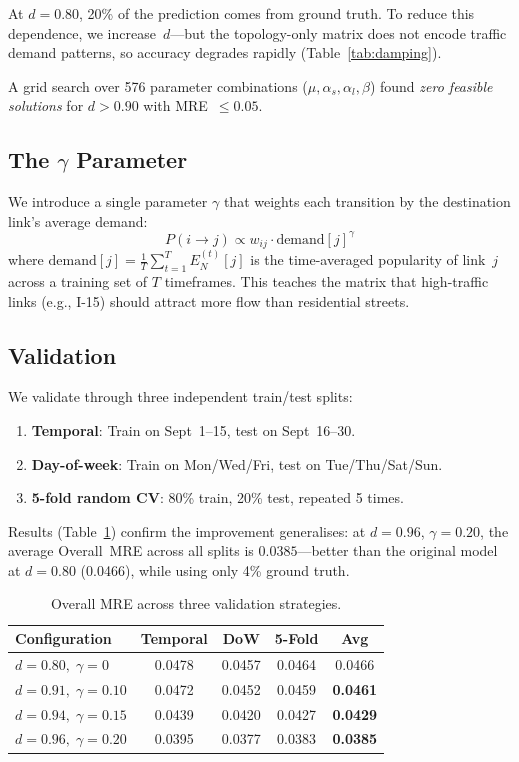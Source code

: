 \documentclass[11pt]{article}
\begin{document}
At $d = 0.80$, 20\% of the prediction comes from ground truth.
To reduce this dependence, we increase~$d$---but the topology-only matrix does not encode traffic demand patterns, so accuracy degrades rapidly (Table~\ref{tab:damping}).

A grid search over 576 parameter combinations ($\mu, \alpha_s, \alpha_l, \beta$) found \emph{zero feasible solutions} for $d > 0.90$ with MRE~$\leq 0.05$.

\subsection{The $\gamma$ Parameter}

We introduce a single parameter $\gamma$ that weights each transition by the destination link's average demand:
\begin{equation}
    \boxed{P(i \to j) \propto w_{ij} \cdot \text{demand}[j]^\gamma}
    \label{eq:gamma}
\end{equation}
where $\text{demand}[j] = \frac{1}{T}\sum_{t=1}^T E_N^{(t)}[j]$ is the time-averaged popularity of link~$j$ across a training set of $T$ timeframes.
This teaches the matrix that high-traffic links (e.g., I-15) should attract more flow than residential streets.

\subsection{Validation}

We validate through three independent train/test splits:
\begin{enumerate}
    \item \textbf{Temporal}: Train on Sept~1--15, test on Sept~16--30.
    \item \textbf{Day-of-week}: Train on Mon/Wed/Fri, test on Tue/Thu/Sat/Sun.
    \item \textbf{5-fold random CV}: 80\% train, 20\% test, repeated 5 times.
\end{enumerate}

Results (Table~\ref{tab:demand_validation}) confirm the improvement generalises: at $d = 0.96$, $\gamma = 0.20$, the average Overall~MRE across all splits is $\mathbf{0.0385}$---better than the original model at $d = 0.80$ (0.0466), while using only 4\% ground truth.

\begin{table}[t]
\centering
\caption{Overall MRE across three validation strategies.}
\label{tab:demand_validation}
\small
\begin{tabular}{lcccc}
\toprule
Configuration & Temporal & DoW & 5-Fold & \textbf{Avg} \\
\midrule
$d{=}0.80,\;\gamma{=}0$ & 0.0478 & 0.0457 & 0.0464 & 0.0466 \\
$d{=}0.91,\;\gamma{=}0.10$ & 0.0472 & 0.0452 & 0.0459 & \textbf{0.0461} \\
$d{=}0.94,\;\gamma{=}0.15$ & 0.0439 & 0.0420 & 0.0427 & \textbf{0.0429} \\
$d{=}0.96,\;\gamma{=}0.20$ & 0.0395 & 0.0377 & 0.0383 & \textbf{0.0385} \\
\bottomrule
\end{tabular}
\end{table}
\end{document}
